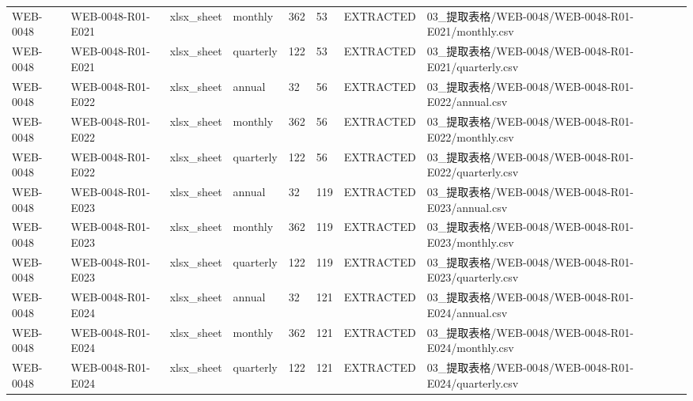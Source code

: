 \begin{landscape}
\begin{longtable}{p{1.8cm}p{2.2cm}p{3.1cm}p{4.7cm}p{1.3cm}p{1.3cm}p{3.0cm}p{5.3cm}}
WEB-0048 & WEB-0048-R01-E021 & xlsx\_\allowbreak{}sheet & monthly & 362 & 53 & EXTRACTED & 03\_\allowbreak{}提取表格/\allowbreak{}WEB-0048/\allowbreak{}WEB-0048-R01-E021/\allowbreak{}monthly.csv\\
WEB-0048 & WEB-0048-R01-E021 & xlsx\_\allowbreak{}sheet & quarterly & 122 & 53 & EXTRACTED & 03\_\allowbreak{}提取表格/\allowbreak{}WEB-0048/\allowbreak{}WEB-0048-R01-E021/\allowbreak{}quarterly.csv\\
WEB-0048 & WEB-0048-R01-E022 & xlsx\_\allowbreak{}sheet & annual & 32 & 56 & EXTRACTED & 03\_\allowbreak{}提取表格/\allowbreak{}WEB-0048/\allowbreak{}WEB-0048-R01-E022/\allowbreak{}annual.csv\\
WEB-0048 & WEB-0048-R01-E022 & xlsx\_\allowbreak{}sheet & monthly & 362 & 56 & EXTRACTED & 03\_\allowbreak{}提取表格/\allowbreak{}WEB-0048/\allowbreak{}WEB-0048-R01-E022/\allowbreak{}monthly.csv\\
WEB-0048 & WEB-0048-R01-E022 & xlsx\_\allowbreak{}sheet & quarterly & 122 & 56 & EXTRACTED & 03\_\allowbreak{}提取表格/\allowbreak{}WEB-0048/\allowbreak{}WEB-0048-R01-E022/\allowbreak{}quarterly.csv\\
WEB-0048 & WEB-0048-R01-E023 & xlsx\_\allowbreak{}sheet & annual & 32 & 119 & EXTRACTED & 03\_\allowbreak{}提取表格/\allowbreak{}WEB-0048/\allowbreak{}WEB-0048-R01-E023/\allowbreak{}annual.csv\\
WEB-0048 & WEB-0048-R01-E023 & xlsx\_\allowbreak{}sheet & monthly & 362 & 119 & EXTRACTED & 03\_\allowbreak{}提取表格/\allowbreak{}WEB-0048/\allowbreak{}WEB-0048-R01-E023/\allowbreak{}monthly.csv\\
WEB-0048 & WEB-0048-R01-E023 & xlsx\_\allowbreak{}sheet & quarterly & 122 & 119 & EXTRACTED & 03\_\allowbreak{}提取表格/\allowbreak{}WEB-0048/\allowbreak{}WEB-0048-R01-E023/\allowbreak{}quarterly.csv\\
WEB-0048 & WEB-0048-R01-E024 & xlsx\_\allowbreak{}sheet & annual & 32 & 121 & EXTRACTED & 03\_\allowbreak{}提取表格/\allowbreak{}WEB-0048/\allowbreak{}WEB-0048-R01-E024/\allowbreak{}annual.csv\\
WEB-0048 & WEB-0048-R01-E024 & xlsx\_\allowbreak{}sheet & monthly & 362 & 121 & EXTRACTED & 03\_\allowbreak{}提取表格/\allowbreak{}WEB-0048/\allowbreak{}WEB-0048-R01-E024/\allowbreak{}monthly.csv\\
WEB-0048 & WEB-0048-R01-E024 & xlsx\_\allowbreak{}sheet & quarterly & 122 & 121 & EXTRACTED & 03\_\allowbreak{}提取表格/\allowbreak{}WEB-0048/\allowbreak{}WEB-0048-R01-E024/\allowbreak{}quarterly.csv\\

\end{longtable}
\end{landscape}
